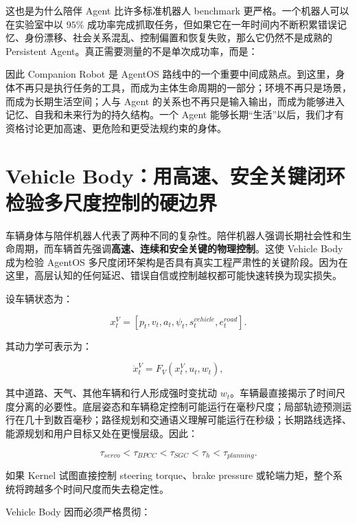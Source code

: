 这也是为什么陪伴 Agent 比许多标准机器人 benchmark 更严格。一个机器人可以在实验室中以 $95\%$ 成功率完成抓取任务，但如果它在一年时间内不断积累错误记忆、身份漂移、社会关系混乱、控制偏置和恢复失败，那么它仍然不是成熟的 Persistent Agent。真正需要测量的不是单次成功率，而是：

\begin{statementbox}
\centering
{}
\end{statementbox}

因此 Companion Robot 是 AgentOS 路线中的一个重要中间成熟点。到这里，身体不再只是执行任务的工具，而成为主体生命周期的一部分；环境不再只是场景，而成为长期生活空间；人与 Agent 的关系也不再只是输入输出，而成为能够进入记忆、自我和未来行为的持久结构。一个 Agent 能够长期“生活”以后，我们才有资格讨论更加高速、更危险和更受法规约束的身体。

\section{Vehicle Body：用高速、安全关键闭环检验多尺度控制的硬边界}

车辆身体与陪伴机器人代表了两种不同的复杂性。陪伴机器人强调长期社会性和生命周期，而车辆首先强调\textbf{高速、连续和安全关键的物理控制}。这使 Vehicle Body 成为检验 AgentOS 多尺度闭环架构是否具有真实工程严肃性的关键阶段。因为在这里，高层认知的任何延迟、错误自信或控制越权都可能快速转换为现实损失。

设车辆状态为：

$$
x_t^V=
[
p_t,v_t,a_t,\psi_t,
s_t^{vehicle},
e_t^{road}
].
$$

其动力学可表示为：

$$
\dot x_t^V
=
F_V(x_t^V,u_t,w_t),
$$

其中道路、天气、其他车辆和行人形成强时变扰动 $w_t$。车辆最直接揭示了时间尺度分离的必要性。底层姿态和车辆稳定控制可能运行在毫秒尺度；局部轨迹预测运行在几十到数百毫秒；路径规划和交通语义理解可能运行在秒级；长期路线选择、能源规划和用户目标又处在更慢层级。因此：

$$
\tau_{servo}
<
\tau_{BPCC}
<
\tau_{SGC}
<
\tau_h
<
\tau_{planning}.
$$

如果 Kernel 试图直接控制 steering torque、brake pressure 或轮端力矩，整个系统将跨越多个时间尺度而失去稳定性。

Vehicle Body 因而必须严格贯彻：

\begin{statementbox}
\centering
{}
\end{statementbox}

